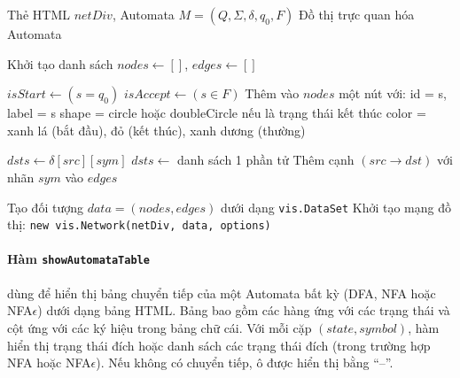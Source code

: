 \documentclass[12pt,a4paper]{report}
\begin{document}
\begin{algorithm}[H]
\caption{Vẽ Automata bằng \texttt{drawNetwork}}
\begin{algorithmic}[1]
\Require Thẻ HTML $netDiv$, Automata $M = (Q,\Sigma,\delta,q_0,F)$
\Ensure Đồ thị trực quan hóa Automata
    \State \Return
\EndIf

\State Khởi tạo danh sách $nodes \gets []$, $edges \gets []$

    \State $isStart \gets (s = q_0)$
    \State $isAccept \gets (s \in F)$
    \State Thêm vào $nodes$ một nút với:
    \State \quad id = s, label = s
    \State \quad shape = circle hoặc doubleCircle nếu là trạng thái kết thúc
    \State \quad color = xanh lá (bắt đầu), đỏ (kết thúc), xanh dương (thường)
\EndFor

        \State $dsts \gets \delta[src][sym]$
            \State $dsts \gets$ danh sách 1 phần tử
        \EndIf
            \State Thêm cạnh $(src \rightarrow dst)$ với nhãn $sym$ vào $edges$
        \EndFor
    \EndFor
\EndFor

\State Tạo đối tượng $data = (nodes, edges)$ dưới dạng \texttt{vis.DataSet}
\State Khởi tạo mạng đồ thị: \texttt{new vis.Network(netDiv, data, options)}

\end{algorithmic}
\end{algorithm}
\hspace*{0.7cm}\paragraph{Hàm \texttt{showAutomataTable}}
dùng để hiển thị bảng chuyển tiếp của một Automata bất kỳ (DFA, NFA hoặc NFA$\epsilon$) dưới dạng bảng HTML. Bảng bao gồm các hàng ứng với các trạng thái và cột ứng với các ký hiệu trong bảng chữ cái. Với mỗi cặp $(state, symbol)$, hàm hiển thị trạng thái đích hoặc danh sách các trạng thái đích (trong trường hợp NFA hoặc NFA$\epsilon$). Nếu không có chuyển tiếp, ô được hiển thị bằng ``--''.
\end{document}
